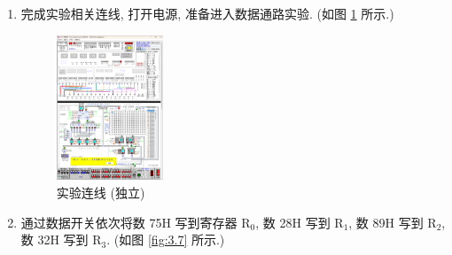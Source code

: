 \documentclass[../main.tex]{subfiles}
\begin{document}
\begin{enumerate}

    \item 完成实验相关连线, 打开电源, 准备进入数据通路实验. (如图 \ref{fig:3.6} 所示.)

          \begin{figure}[htbp]
              \centering
              \includegraphics[width=0.3\textwidth]{screenshots/3.2.1.png}
              \caption{实验连线 (独立)}
              \label{fig:3.6}
          \end{figure}

    \item 通过数据开关依次将数 75H 写到寄存器 R$_0$, 数 28H 写到 R$_1$, 数 89H 写到 R$_2$, 数 32H 写到 R$_3$. (如图 \ref{fig:3.7} 所示.)


\end{enumerate}
\end{document}
